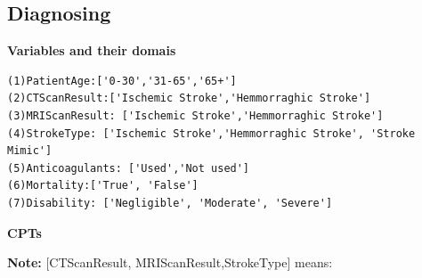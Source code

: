 \documentclass[a4paper, 11pt]{article}
\begin{document}
\subsection{Diagnosing}
\label{sec:bayesian-networks}
\textbf{Variables and their domais}
\begin{lstlisting}
(1)PatientAge:['0-30','31-65','65+']
(2)CTScanResult:['Ischemic Stroke','Hemmorraghic Stroke']
(3)MRIScanResult: ['Ischemic Stroke','Hemmorraghic Stroke']
(4)StrokeType: ['Ischemic Stroke','Hemmorraghic Stroke', 'Stroke Mimic']
(5)Anticoagulants: ['Used','Not used']
(6)Mortality:['True', 'False']
(7)Disability: ['Negligible', 'Moderate', 'Severe']
\end{lstlisting}
\textbf{CPTs}

\textbf{Note:} [CTScanResult, MRIScanResult,StrokeType] means:
\end{document}
